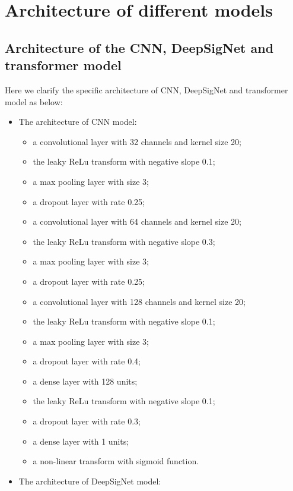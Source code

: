 \documentclass[]{article}
\renewcommand{\(}{\left(}
\renewcommand{\)}{\right)}
\begin{document}
	\appendix
	\section{Architecture of different models}
	\label{apdix-architecture}
	\subsection{Architecture of the CNN, DeepSigNet and transformer model}
	\label{subapdix-architecture-cnndeepsignettransform}
	Here we clarify the specific architecture of CNN, DeepSigNet and transformer model as below:
	\begin{itemize}
		\item The architecture of CNN model:
		\begin{itemize}
			\item[-] a convolutional layer with 32 channels and kernel size 20;
			\item[-] the leaky ReLu transform with negative slope 0.1;
			\item[-] a max pooling layer with size 3;
			\item[-] a dropout layer with rate 0.25;			
			\item[-] a convolutional layer with 64 channels and kernel size 20;
			\item[-] the leaky ReLu transform with negative slope 0.3;
			\item[-] a max pooling layer with size 3;
			\item[-] a dropout layer with rate 0.25;
			\item[-] a convolutional layer with 128 channels and kernel size 20;
			\item[-] the leaky ReLu transform with negative slope 0.1;
			\item[-] a max pooling layer with size 3;
			\item[-] a dropout layer with rate 0.4;
			\item[-] a dense layer with 128 units;
			\item[-] the leaky ReLu transform with negative slope 0.1;
			\item[-] a dropout layer with rate 0.3;
			\item[-] a dense layer with 1 units;
			\item[-] a non-linear transform with sigmoid function.			
		\end{itemize}
		\item The architecture of DeepSigNet model:

\end{itemize}
\end{document}
